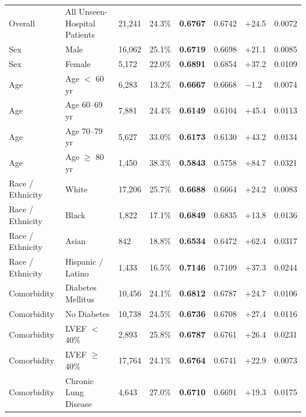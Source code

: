\begin{table}[H]
\centering
\caption{}
\label{tab:supp_equity}
\tablefont
\setlength{\tabcolsep}{3.4pt}
\begin{tabularx}{\textwidth}{@{}L{2.3cm} Y R{1.15cm} R{1.15cm} R{1.45cm} R{1.45cm} R{1.25cm} R{1.15cm}@{}}
\toprule
{} &  &  &  &  &  &  &  \\
\midrule
Overall & All Unseen-Hospital Patients & 21,241 & 24.3\% & \textbf{0.6767} & 0.6742 & +24.5 & 0.0072 \\
Sex & Male & 16,062 & 25.1\% & \textbf{0.6719} & 0.6698 & +21.1 & 0.0085 \\
Sex & Female & 5,172 & 22.0\% & \textbf{0.6891} & 0.6854 & +37.2 & 0.0109 \\
Age & Age $<$ 60 yr & 6,283 & 13.2\% & \textbf{0.6667} & 0.6668 & $-$1.2 & 0.0074 \\
Age & Age 60--69 yr & 7,881 & 24.4\% & \textbf{0.6149} & 0.6104 & +45.4 & 0.0113 \\
Age & Age 70--79 yr & 5,627 & 33.0\% & \textbf{0.6173} & 0.6130 & +43.2 & 0.0134 \\
Age & Age $\ge$ 80 yr & 1,450 & 38.3\% & \textbf{0.5843} & 0.5758 & +84.7 & 0.0321 \\
Race / Ethnicity & White & 17,206 & 25.7\% & \textbf{0.6688} & 0.6664 & +24.2 & 0.0083 \\
Race / Ethnicity & Black & 1,822 & 17.1\% & \textbf{0.6849} & 0.6835 & +13.8 & 0.0136 \\
Race / Ethnicity & Asian & 842 & 18.8\% & \textbf{0.6534} & 0.6472 & +62.4 & 0.0317 \\
Race / Ethnicity & Hispanic / Latino & 1,433 & 16.5\% & \textbf{0.7146} & 0.7109 & +37.3 & 0.0244 \\
Comorbidity & Diabetes Mellitus & 10,456 & 24.1\% & \textbf{0.6812} & 0.6787 & +24.7 & 0.0106 \\
Comorbidity & No Diabetes & 10,738 & 24.5\% & \textbf{0.6736} & 0.6708 & +27.4 & 0.0116 \\
Comorbidity & LVEF $<$ 40\% & 2,893 & 25.8\% & \textbf{0.6787} & 0.6761 & +26.4 & 0.0231 \\
Comorbidity & LVEF $\ge$ 40\% & 17,764 & 24.1\% & \textbf{0.6764} & 0.6741 & +22.9 & 0.0073 \\
Comorbidity & Chronic Lung Disease & 4,643 & 27.0\% & \textbf{0.6710} & 0.6691 & +19.3 & 0.0175 \\

\end{tabularx}
\end{table}
